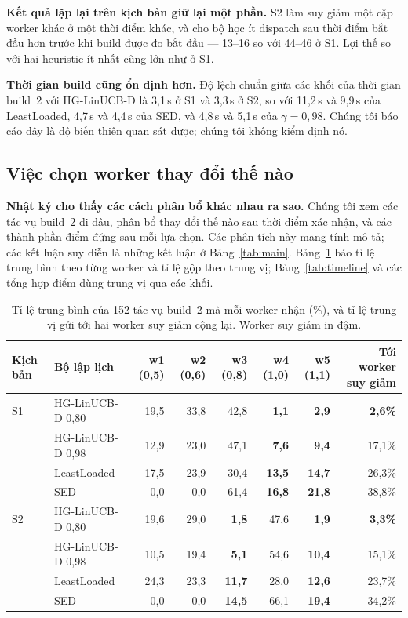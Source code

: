 \documentclass[final,5p,times,twocolumn]{elsarticle}
\begin{document}
\textbf{Kết quả lặp lại trên kịch bản giữ lại một phần.} S2 làm suy giảm một cặp worker khác ở một thời điểm khác, và cho bộ học ít dispatch sau thời điểm bắt đầu hơn trước khi build được đo bắt đầu --- 13--16 so với 44--46 ở S1. Lợi thế so với hai heuristic ít nhất cũng lớn như ở S1.

\textbf{Thời gian build cũng ổn định hơn.} Độ lệch chuẩn giữa các khối của thời gian build~2 với HG-LinUCB-D là 3,1\,s ở S1 và 3,3\,s ở S2, so với 11,2\,s và 9,9\,s của LeastLoaded, 4,7\,s và 4,4\,s của SED, và 4,8\,s và 5,1\,s của $\gamma=0{,}98$. Chúng tôi báo cáo đây là độ biến thiên quan sát được; chúng tôi không kiểm định nó.

\subsection{Việc chọn worker thay đổi thế nào}
\label{sec:mech}

\textbf{Nhật ký cho thấy các cách phân bổ khác nhau ra sao.} Chúng tôi xem các tác vụ build~2 đi đâu, phân bổ thay đổi thế nào sau thời điểm xác nhận, và các thành phần điểm đứng sau mỗi lựa chọn. Các phân tích này mang tính mô tả; các kết luận suy diễn là những kết luận ở Bảng~\ref{tab:main}. Bảng~\ref{tab:alloc} báo tỉ lệ trung bình theo từng worker và tỉ lệ gộp theo trung vị; Bảng~\ref{tab:timeline} và các tổng hợp điểm dùng trung vị qua các khối.

\begin{table}[t]
\centering
\caption{Tỉ lệ trung bình của 152 tác vụ build~2 mà mỗi worker nhận (\%), và tỉ lệ trung vị gửi tới hai worker suy giảm cộng lại. Worker suy giảm in đậm.}
\label{tab:alloc}
\footnotesize
\begin{tabular}{llrrrrrr}
\toprule
Kịch bản & Bộ lập lịch & w1 (0,5) & w2 (0,6) & w3 (0,8) & w4 (1,0) & w5 (1,1) & Tới worker suy giảm \\
\midrule
S1 & HG-LinUCB-D 0,80 & 19,5 & 33,8 & 42,8 & \textbf{1,1} & \textbf{2,9} & \textbf{2,6\%} \\
 & HG-LinUCB-D 0,98 & 12,9 & 23,0 & 47,1 & \textbf{7,6} & \textbf{9,4} & 17,1\% \\
 & LeastLoaded & 17,5 & 23,9 & 30,4 & \textbf{13,5} & \textbf{14,7} & 26,3\% \\
 & SED & 0,0 & 0,0 & 61,4 & \textbf{16,8} & \textbf{21,8} & 38,8\% \\
\midrule
S2 & HG-LinUCB-D 0,80 & 19,6 & 29,0 & \textbf{1,8} & 47,6 & \textbf{1,9} & \textbf{3,3\%} \\
 & HG-LinUCB-D 0,98 & 10,5 & 19,4 & \textbf{5,1} & 54,6 & \textbf{10,4} & 15,1\% \\
 & LeastLoaded & 24,3 & 23,3 & \textbf{11,7} & 28,0 & \textbf{12,6} & 23,7\% \\
 & SED & 0,0 & 0,0 & \textbf{14,5} & 66,1 & \textbf{19,4} & 34,2\% \\
\bottomrule
\end{tabular}
\end{table}
\end{document}
